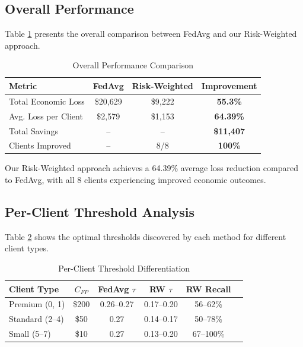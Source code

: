 \documentclass[conference]{IEEEtran}
\begin{document}
\subsection{Overall Performance}

Table \ref{tab:main_results} presents the overall comparison between FedAvg and our Risk-Weighted approach.

\begin{table}[h]
\centering
\caption{Overall Performance Comparison}
\label{tab:main_results}
\begin{tabular}{@{}lccc@{}}
\toprule
\textbf{Metric} & \textbf{FedAvg} & \textbf{Risk-Weighted} & \textbf{Improvement} \\
\midrule
Total Economic Loss & \$20,629 & \$9,222 & \textbf{55.3\%} \\
Avg. Loss per Client & \$2,579 & \$1,153 & \textbf{64.39\%} \\
Total Savings & -- & -- & \textbf{\$11,407} \\
Clients Improved & -- & 8/8 & \textbf{100\%} \\
\bottomrule
\end{tabular}
\end{table}

Our Risk-Weighted approach achieves a 64.39\% average loss reduction compared to FedAvg, with all 8 clients experiencing improved economic outcomes.

\subsection{Per-Client Threshold Analysis}

Table \ref{tab:threshold_analysis} shows the optimal thresholds discovered by each method for different client types.

\begin{table}[h]
\centering
\caption{Per-Client Threshold Differentiation}
\label{tab:threshold_analysis}
\begin{tabular}{@{}lccccc@{}}
\toprule
\textbf{Client Type} & \textbf{$C_{FP}$} & \textbf{FedAvg $\tau$} & \textbf{RW $\tau$} & \textbf{RW Recall} \\
\midrule
Premium (0, 1) & \$200 & 0.26--0.27 & 0.17--0.20 & 56--62\% \\
Standard (2--4) & \$50 & 0.27 & 0.14--0.17 & 50--78\% \\
Small (5--7) & \$10 & 0.27 & 0.13--0.20 & 67--100\% \\
\bottomrule
\end{tabular}
\end{table}
\end{document}
